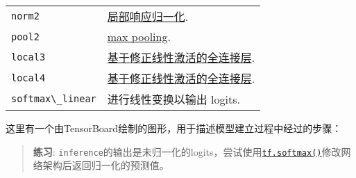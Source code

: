 \begin{longtable}[c]{@{}ll@{}}
\begin{minipage}[t]{0.05\columnwidth}\raggedright\strut
\lstinline{norm2}
\strut\end{minipage} &
\begin{minipage}[t]{0.05\columnwidth}\raggedright\strut
\href{https://github.com/jikexueyuanwiki/tensorflow-zh/blob/master/SOURCE/api_docs/python/nn.md\#local_response_normalization}{局部响应归一化}.
\strut\end{minipage}\tabularnewline
\begin{minipage}[t]{0.05\columnwidth}\raggedright\strut
\lstinline{pool2}
\strut\end{minipage} &
\begin{minipage}[t]{0.05\columnwidth}\raggedright\strut
\href{https://github.com/jikexueyuanwiki/tensorflow-zh/blob/master/SOURCE/api_docs/python/nn.md\#max_pool}{max
pooling}.
\strut\end{minipage}\tabularnewline
\begin{minipage}[t]{0.05\columnwidth}\raggedright\strut
\lstinline{local3}
\strut\end{minipage} &
\begin{minipage}[t]{0.05\columnwidth}\raggedright\strut
\href{https://github.com/jikexueyuanwiki/tensorflow-zh/blob/master/SOURCE/api_docs/python/nn.md}{基于修正线性激活的全连接层}.
\strut\end{minipage}\tabularnewline
\begin{minipage}[t]{0.05\columnwidth}\raggedright\strut
\lstinline{local4}
\strut\end{minipage} &
\begin{minipage}[t]{0.05\columnwidth}\raggedright\strut
\href{https://github.com/jikexueyuanwiki/tensorflow-zh/blob/master/SOURCE/api_docs/python/nn.md}{基于修正线性激活的全连接层}.
\strut\end{minipage}\tabularnewline
\begin{minipage}[t]{0.05\columnwidth}\raggedright\strut
\lstinline{softmax\_linear}
\strut\end{minipage} &
\begin{minipage}[t]{0.05\columnwidth}\raggedright\strut
进行线性变换以输出 logits.
\strut\end{minipage}\tabularnewline
\bottomrule
\end{longtable}

这里有一个由TensorBoard绘制的图形，用于描述模型建立过程中经过的步骤：

\begin{quote}
\textbf{练习}:
\lstinline{inference}的输出是未归一化的logits，尝试使用\href{tensorflow-zh/SOURCE/api_docs/python/nn.md\#softmax}{\lstinline{tf.softmax()}}修改网络架构后返回归一化的预测值。
\end{quote}


